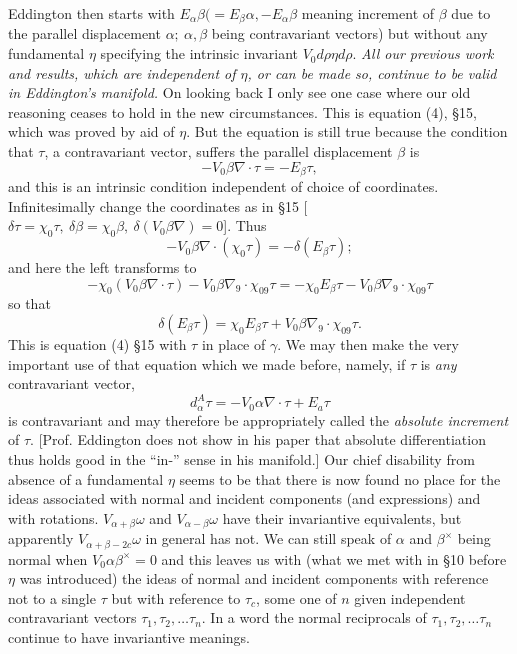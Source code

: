 \documentclass[11pt]{article}
\begin{document}
\indent Eddington then starts with $E_\alpha\beta(=E_\beta\alpha,-E_\alpha\beta$ meaning increment of $\beta$ due to the parallel displacement $\alpha;\ \alpha,\beta$ being contravariant vectors) but without any fundamental $\eta$ specifying the intrinsic invariant $V_0d\rho\eta d\rho$. \emph{All our previous work and results, which are independent of $\eta$, or can be made so, continue to be valid in Eddington's manifold.} On looking back I only see one case where our old reasoning ceases to hold in the new circumstances. This is equation (4), \S15, which was proved by aid of $\eta$. But the equation is still true because the condition that $\tau$, a contravariant vector, suffers the parallel displacement $\beta$ is
\[
-V_0\beta\nabla\mathbin{\cdot}\tau=-E_\beta\tau,
\]
and this is an intrinsic condition independent of choice of coordinates. Infinitesimally change the coordinates as in \S15 [$\delta\tau=\chi_0\tau,\ \delta\beta=\chi_0\beta,\ \delta(V_0\beta\nabla)=0$]. Thus
\[
-V_0\beta\nabla\mathbin{\cdot}(\chi_0\tau)=-\delta(E_\beta\tau);
\]
and here the left transforms to
\[
-\chi_0(V_0\beta\nabla\mathbin{\cdot}\tau)-V_0\beta\nabla_9\mathbin{\cdot}\chi_{09}\tau=-\chi_0E_\beta\tau-V_0\beta\nabla_9\mathbin{\cdot}\chi_{09}\tau
\]
so that
\[
\delta(E_\beta\tau)=\chi_0E_\beta\tau+V_0\beta\nabla_9\mathbin{\cdot}\chi_{09}\tau.
\]
This is equation (4) \S15 with $\tau$ in place of $\gamma$. We may then make the very important use of that equation which we made before, namely, if $\tau$ is \emph{any} contravariant vector,
\[
d_\alpha^A\tau=-V_0\alpha\nabla\mathbin{\cdot}\tau+E_a\tau
\]
is contravariant and may therefore be appropriately called the \emph{absolute increment} of $\tau$. [Prof. Eddington does not show in his paper that absolute differentiation thus holds good in the ``in-'' sense in his manifold.]
\indent Our chief disability from absence of a fundamental $\eta$ seems to be that there is now found no place for the ideas associated with normal and incident components (and expressions) and with rotations. $V_{\alpha+\beta}\omega$ and $V_{\alpha-\beta}\omega$ have their invariantive equivalents, but apparently $V_{\alpha+\beta-2c}\omega$ in general has not. We can still speak of $\alpha$ and $\beta^\times$ being normal when $V_0\alpha\beta^\times=0$ and this leaves us with (what we met with in \S10 before $\eta$ was introduced) the ideas of normal and incident components with reference not to a single $\tau$ but with reference to $\tau_c$, some one of $n$ given independent contravariant vectors $\tau_1,\tau_2,\ldots\tau_n$. In a word the normal reciprocals of $\tau_1,\tau_2,\ldots\tau_n$ continue to have invariantive meanings.
\end{document}
